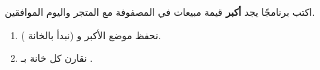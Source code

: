 \begin{statement}
اكتب برنامجًا يجد \textbf{أكبر} قيمة مبيعات في المصفوفة مع المتجر واليوم الموافقين.
\end{statement}
\begin{stepsbox}\begin{enumerate}
\item نحفظ موضع الأكبر  و (نبدأ بالخانة \code{[0][0]}).
\item نقارن كل خانة بـ .
\end{enumerate}\end{stepsbox}
